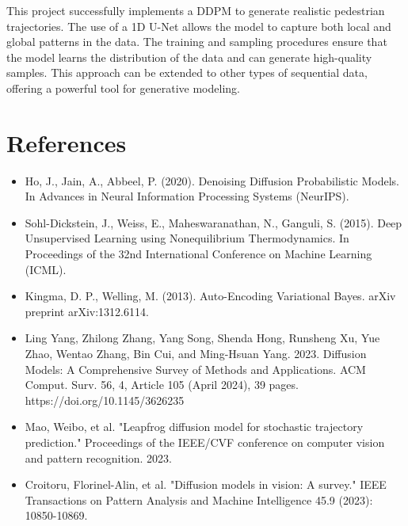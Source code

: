 \documentclass[10pt,a4paper]{article}
\begin{document}
This project successfully implements a DDPM to generate realistic pedestrian trajectories. The use of a 1D U-Net allows the model to capture both local and global patterns in the data. The training and sampling procedures ensure that the model learns the distribution of the data and can generate high-quality samples. This approach can be extended to other types of sequential data, offering a powerful tool for generative modeling.


\section*{References}

\begin{itemize}
\item Ho, J., Jain, A.,  Abbeel, P. (2020). Denoising Diffusion Probabilistic Models. In Advances in Neural Information Processing Systems (NeurIPS).
\item Sohl-Dickstein, J., Weiss, E., Maheswaranathan, N.,  Ganguli, S. (2015). Deep Unsupervised Learning using Nonequilibrium Thermodynamics. In Proceedings of the 32nd International Conference on Machine Learning (ICML).
\item Kingma, D. P.,  Welling, M. (2013). Auto-Encoding Variational Bayes. arXiv preprint arXiv:1312.6114.
\item Ling Yang, Zhilong Zhang, Yang Song, Shenda Hong, Runsheng Xu, Yue Zhao, Wentao Zhang, Bin Cui, and Ming-Hsuan Yang. 2023. Diffusion Models: A Comprehensive Survey of Methods and Applications. ACM Comput. Surv. 56, 4, Article 105 (April 2024), 39 pages. https://doi.org/10.1145/3626235
\item Mao, Weibo, et al. "Leapfrog diffusion model for stochastic trajectory prediction." Proceedings of the IEEE/CVF conference on computer vision and pattern recognition. 2023.
\item Croitoru, Florinel-Alin, et al. "Diffusion models in vision: A survey." IEEE Transactions on Pattern Analysis and Machine Intelligence 45.9 (2023): 10850-10869.
\end{itemize}
\end{document}
